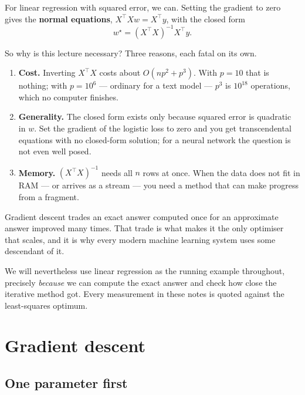 \documentclass[11pt]{article}
\begin{document}
For linear regression with squared error, we can. Setting the gradient to zero
gives the \textbf{normal equations}, $X^\top X w = X^\top y$, with the closed
form
\[
  w^\star = (X^\top X)^{-1} X^\top y .
\]

So why is this lecture necessary? Three reasons, each fatal on its own.

\begin{enumerate}[leftmargin=*]
  \item \textbf{Cost.} Inverting $X^\top X$ costs about $O(np^2 + p^3)$. With
    $p = 10$ that is nothing; with $p = 10^6$ --- ordinary for a text model ---
    $p^3$ is $10^{18}$ operations, which no computer finishes.
  \item \textbf{Generality.} The closed form exists only because squared error
    is quadratic in $w$. Set the gradient of the logistic loss to zero and you
    get transcendental equations with no closed-form solution; for a neural
    network the question is not even well posed.
  \item \textbf{Memory.} $(X^\top X)^{-1}$ needs all $n$ rows at once. When the
    data does not fit in RAM --- or arrives as a stream --- you need a method
    that can make progress from a fragment.
\end{enumerate}

\begin{keyidea}
Gradient descent trades an exact answer computed once for an approximate answer
improved many times. That trade is what makes it the only optimiser that scales,
and it is why every modern machine learning system uses some descendant of it.
\end{keyidea}

We will nevertheless use linear regression as the running example throughout,
precisely \emph{because} we can compute the exact answer and check how close the
iterative method got. Every measurement in these notes is quoted against the
least-squares optimum.

\notesources{\AMLUnitIIISources}

\newpage
\section{Gradient descent}
\label{sec:gd}

\subsection{One parameter first}
\end{document}

